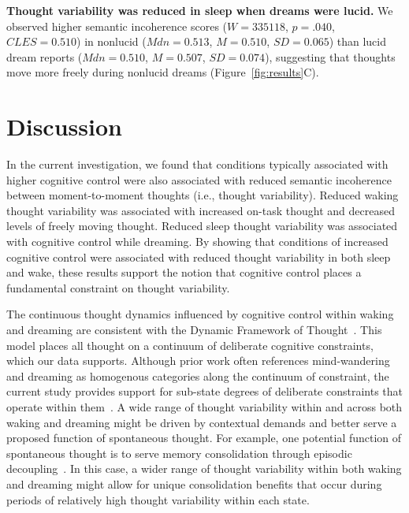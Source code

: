 \documentclass[10pt,a4paper,twocolumn]{article}
\begin{document}
\textbf{Thought variability was reduced in sleep when dreams were lucid.}
We observed higher semantic incoherence scores ($\mathit{W}=335118$, $\mathit{p}=.040$, $\mathit{CLES}=0.510$) in nonlucid ($\mathit{Mdn}=0.513$, $\mathit{M}=0.510$, $\mathit{SD}=0.065$) than lucid dream reports ($\mathit{Mdn}=0.510$, $\mathit{M}=0.507$, $\mathit{SD}=0.074$), suggesting that thoughts move more freely during nonlucid dreams (Figure~\ref{fig:results}C).



\section*{Discussion}

In the current investigation, we found that conditions typically associated with higher cognitive control were also associated with reduced semantic incoherence between moment-to-moment thoughts (i.e., thought variability). Reduced waking thought variability was associated with increased on-task thought and decreased levels of freely moving thought. Reduced sleep thought variability was associated with cognitive control while dreaming. By showing that conditions of increased cognitive control were associated with reduced thought variability in both sleep and wake, these results support the notion that cognitive control places a fundamental constraint on thought variability.

\par
The continuous thought dynamics influenced by cognitive control within waking and dreaming are consistent with the Dynamic Framework of Thought~\cite{christoff2016}. This model places all thought on a continuum of deliberate cognitive constraints, which our data supports. Although prior work often references mind-wandering and dreaming as homogenous categories along the continuum of constraint, the current study provides support for sub-state degrees of deliberate constraints that operate within them~\cite{mallett2021}. A wide range of thought variability within and across both waking and dreaming might be driven by contextual demands and better serve a proposed function of spontaneous thought. For example, one potential function of spontaneous thought is to serve memory consolidation through episodic decoupling~\cite{mildner2019,mills2018}. In this case, a wider range of thought variability within both waking and dreaming might allow for unique consolidation benefits that occur during periods of relatively high thought variability within each state.
\end{document}
